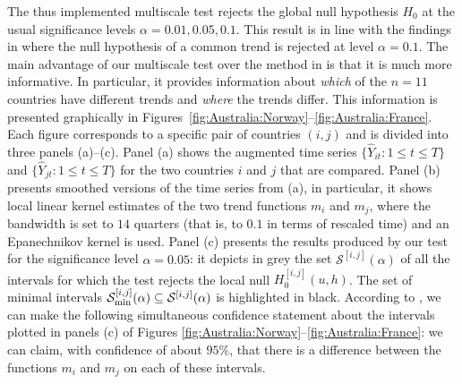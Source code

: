 \documentclass[12pt]{article}
\makeatletter
\renewcommand{\eqref}[1]{\tagform@{\ref{#1}}}
\makeatother
\begin{document}
The thus implemented multiscale test rejects the global null hypothesis $H_0$ at the usual significance levels $\alpha =0.01,0.05, 0.1$. This result is in line with the findings in \cite{Zhang2012} where the null hypothesis of a common trend is rejected at level $\alpha = 0.1$.
The main advantage of our multiscale test over the method in \cite{Zhang2012} is that it is much more informative. In particular, it provides information about \textit{which} of the $n=11$ countries have different trends and \textit{where} the trends differ. This information is presented graphically in Figures~\ref{fig:Australia:Norway}--\ref{fig:Australia:France}. Each figure corresponds to a specific pair of countries $(i, j)$ and is divided into three panels (a)--(c). 
Panel (a) shows the augmented time series $\{\widehat{Y}_{it}: 1 \le t \le T\}$ and $\{\widehat{Y}_{jt}: 1 \le t \le T\}$ for the two countries $i$ and $j$ that are compared. 
Panel (b) presents smoothed versions of the time series from (a), in particular, it shows local linear kernel estimates of the two trend functions $m_i$ and $m_j$, where the bandwidth is set to $14$ quarters (that is, to $0.1$ in terms of rescaled time) and an Epanechnikov kernel is used. Panel (c) presents the results produced by our test for the significance level $\alpha = 0.05$:
it depicts in grey the set $\mathcal{S}^{[i, j]}(\alpha)$ of all the intervals for which the test rejects the local null $H_0^{[i, j]}(u, h)$. The set of minimal intervals $\mathcal{S}^{[i, j]}_{\textnormal{min}}(\alpha) \subseteq \mathcal{S}^{[i, j]}(\alpha)$ is highlighted in black. According to \eqref{eq:CS-v2}, we can make the following simultaneous confidence statement about the intervals plotted in panels (c) of Figures \ref{fig:Australia:Norway}--\ref{fig:Australia:France}: we can claim, with confidence of about $95\%$, that there is a difference between the functions $m_i$ and $m_j$ on each of these intervals. 
\end{document}
